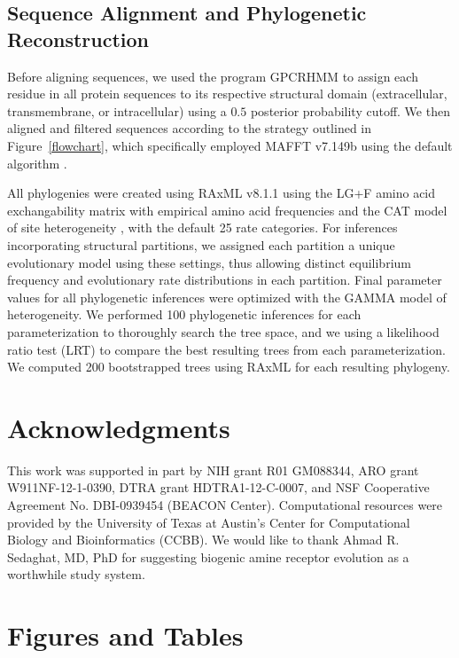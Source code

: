 \documentclass[fleqn,10pt]{wlpeerj}
\begin{document}
\subsection*{Sequence Alignment and Phylogenetic Reconstruction}
Before aligning sequences, we used the program GPCRHMM \citep{Wistrand2006} to assign each residue in all protein sequences to its respective structural domain (extracellular, transmembrane, or intracellular) using a $0.5$ posterior probability cutoff. We then aligned and filtered sequences according to the strategy outlined in Figure~\ref{flowchart}, which specifically employed MAFFT v7.149b using the default algorithm \citep{mafftv7}. 

All phylogenies were created using RAxML v8.1.1 \citep{raxml} using the LG+F \citep{LG} amino acid exchangability matrix with empirical amino acid frequencies and the CAT model of site heterogeneity \citep{Stamatakis2006}, with the default 25 rate categories. For inferences incorporating structural partitions, we assigned each partition a unique evolutionary model using these settings, thus allowing distinct equilibrium frequency and evolutionary rate distributions in each partition. Final parameter values for all phylogenetic inferences were optimized with the GAMMA model of heterogeneity. We performed 100 phylogenetic inferences for each parameterization to thoroughly search the tree space, and we using a likelihood ratio test (LRT) to compare the best resulting trees from each parameterization. We computed 200 bootstrapped trees using RAxML for each resulting phylogeny.


\section*{Acknowledgments}
This work was supported in part by NIH grant R01 GM088344, ARO grant W911NF-12-1-0390, DTRA grant HDTRA1-12-C-0007, and NSF Cooperative Agreement No. DBI-0939454 (BEACON Center).  Computational resources were provided by the University of Texas at Austin's Center for Computational Biology and Bioinformatics (CCBB). We would like to thank Ahmad R. Sedaghat, MD, PhD for suggesting biogenic amine receptor evolution as a worthwhile study system.





\newpage


\section*{Figures and Tables}
\end{document}
